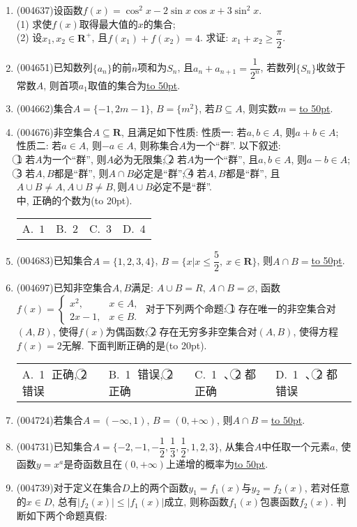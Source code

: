 \documentclass[10pt,a4paper]{article}
\newcommand{\blank}[1]{\underline{\hbox to #1pt{}}}
\newcommand{\bracket}[1]{(\hbox to #1pt{})}
\newcommand{\fourch}[4]{\par\begin{tabular}{p{.23\textwidth}p{.23\textwidth}p{.23\textwidth}p{.23\textwidth}}
A.~#1 &B.~#2& C.~#3& D.~#4
\end{tabular}}
\begin{document}
\begin{enumerate}[1.]
\item {\tiny (004637)}设函数$f(x)=\cos^2x-2\sin x\cos x+3\sin^2x$.\\
(1) 求使$f(x)$取得最大值的$x$的集合;\\
(2) 设$x_1,x_2\in \mathbf{R}^+$, 且$f(x_1)+f(x_2)=4$. 求证: $x_1+x_2\ge \dfrac{\pi}2$.
\item {\tiny (004651)}已知数列$\{a_n\}$的前$n$项和为$S_n$, 且$a_n+a_{n+1}=\dfrac 1{2^n}$, 若数列$\{S_n\}$收敛于常数$A$, 则首项$a_1$取值的集合为\blank{50}.
\item {\tiny (004662)}集合$A=\{-1, 2m-1\}$, $B=\{m^2\}$, 若$B\subseteq A$, 则实数$m=$\blank{50}.
\item {\tiny (004676)}非空集合$A\subseteq \mathbf{R}$, 且满足如下性质:
性质一: 若$a,b\in A$, 则$a+b\in A$;
性质二: 若$a\in A$, 则$-a\in A$, 则称集合$A$为一个``群''. 以下叙述:\\
\textcircled{1} 若$A$为一个``群'', 则$A$必为无限集;
\textcircled{2} 若$A$为一个``群'', 且$a,b\in A$, 则$a-b\in A$;
\textcircled{3} 若$A,B$都是``群'', 则$A\cap B$必定是``群'';
\textcircled{4} 若$A,B$都是``群'', 且$A\cup B\ne A,A\cup B\ne B,$则$A\cup B$必定不是``群''.\\
中, 正确的个数为\bracket{20}.
\fourch{$1$}{$2$}{$3$}{$4$}
\item {\tiny (004683)}已知集合$A=\{1,2,3,4\}$, $B=\{x|x\le \dfrac 52, \ x\in \mathbf{R}\}$, 则$A\cap B=$\blank{50}.
\item {\tiny (004697)}已知非空集合$A,B$满足: $A\cup B=R$, $A\cap B=\varnothing$, 函数$f(x)=\begin{cases}
x^2, &  x\in A,  \\ 2x-1, &  x\in B.  \end{cases}$ 对于下列两个命题: \textcircled{1} 存在唯一的非空集合对$(A,B)$, 使得$f(x)$为偶函数; \textcircled{2} 存在无穷多非空集合对$(A,B)$, 使得方程$f(x)=2$无解. 下面判断正确的是\bracket{20}.
\fourch{\textcircled{1} 正确, \textcircled{2} 错误}{\textcircled{1} 错误, \textcircled{2} 正确}{\textcircled{1} 、\textcircled{2} 都正确}{\textcircled{1} 、\textcircled{2} 都错误}
\item {\tiny (004724)}若集合$A=(-\infty ,1)$, $B=(0,+\infty)$, 则$A\cap B=$\blank{50}.
\item {\tiny (004731)}已知集合$A=\{-2,-1,-\dfrac 12,\dfrac 13,\dfrac 12,1,2,3\}$, 从集合$A$中任取一个元素$a$, 使函数$y=x^a$是奇函数且在$(0,+\infty)$上递增的概率为\blank{50}.
\item {\tiny (004739)}对于定义在集合$D$上的两个函数$y_1=f_1(x)$与$y_2=f_2(x)$, 若对任意的$x\in D$, 总有$|f_2(x)|\le |f_1(x)|$成立, 则称函数$f_1(x)$包裹函数$f_2(x)$. 判断如下两个命题真假:\\

\end{enumerate}
\end{document}
